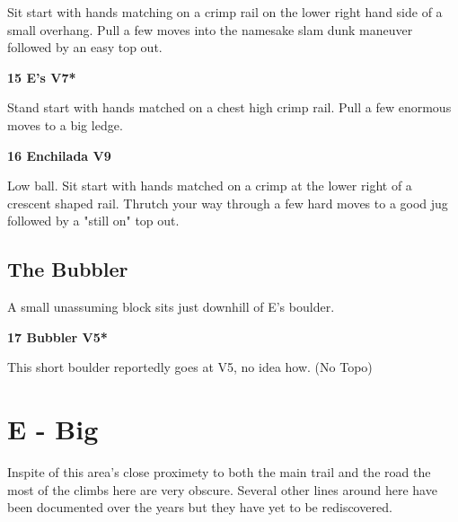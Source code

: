 \begin{multicols}{2}
					\begin{adjustwidth}{0.5cm}{}				
					Sit start with hands matching on a crimp rail on the lower right hand side of a small overhang. Pull a few moves into the namesake slam dunk maneuver followed by an easy top out.
					\end{adjustwidth}
					\label{rt:E's}
\colorbox{Goldenrod!50}{
\parbox{0.95\linewidth}{
\textbf{
15 E's V7*  
}
}
}

					\begin{adjustwidth}{0.5cm}{}				
					Stand start with hands matched on a chest high crimp rail. Pull a few enormous moves to a big ledge.
					\end{adjustwidth}

					\label{rt:Enchilada}
\colorbox{Goldenrod!50}{
\parbox{0.95\linewidth}{
\textbf{
16 Enchilada V9    
}
}
}

					\begin{adjustwidth}{0.5cm}{}				
					Low ball. Sit start with hands matched on a crimp at the lower right of a crescent shaped rail. Thrutch your way through a few hard moves to a good jug followed by a "still on" top out.
					\end{adjustwidth}
			\subsection*{The Bubbler}\label{bf:The Bubbler}
			A small unassuming block sits just downhill of E's boulder.\\
			
					\label{rt:Bubbler}
\colorbox{RoyalBlue!20}{
\parbox{0.95\linewidth}{
\textbf{
17 Bubbler V5*  
}
}
}

					\begin{adjustwidth}{0.5cm}{}				
					This short boulder reportedly goes at V5, no idea how.
						\newline (No Topo) 
					\end{adjustwidth}
\newpage

		\section{E - Big}\label{sa:Big}
	Inspite of this area's close proximety to both the main trail and the road the most of the climbs here are very obscure. Several other lines around here have been documented over the years but they have yet to be rediscovered.\\


\end{multicols}

